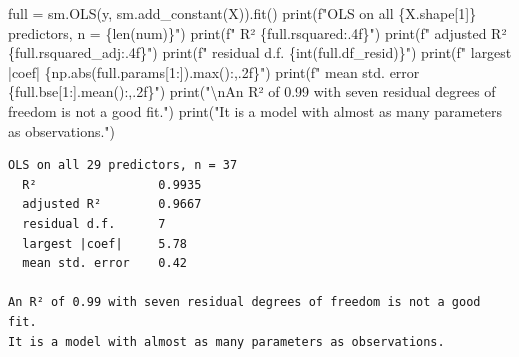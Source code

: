 \documentclass[
  letterpaper,
  10pt,
  twoside,
  openright,
  numbers=noenddot,
  chapterprefix=true]{scrbook}
\newenvironment{Shaded}{}{}
\newcommand{\BuiltInTok}[1]{\textcolor[rgb]{0.84,0.23,0.29}{#1}}
\newcommand{\CharTok}[1]{\textcolor[rgb]{0.01,0.18,0.38}{#1}}
\newcommand{\DecValTok}[1]{\textcolor[rgb]{0.00,0.36,0.77}{#1}}
\newcommand{\NormalTok}[1]{\textcolor[rgb]{0.14,0.16,0.18}{#1}}
\newcommand{\OperatorTok}[1]{\textcolor[rgb]{0.14,0.16,0.18}{#1}}
\newcommand{\SpecialCharTok}[1]{\textcolor[rgb]{0.00,0.36,0.77}{#1}}
\newcommand{\SpecialStringTok}[1]{\textcolor[rgb]{0.01,0.18,0.38}{#1}}
\newcommand{\StringTok}[1]{\textcolor[rgb]{0.01,0.18,0.38}{#1}}
\begin{document}
\label{check-variance}
\begin{Shaded}
\begin{Highlighting}[]
\NormalTok{full }\OperatorTok{=}\NormalTok{ sm.OLS(y, sm.add\_constant(X)).fit()}
\BuiltInTok{print}\NormalTok{(}\SpecialStringTok{f"OLS on all }\SpecialCharTok{\{}\NormalTok{X}\SpecialCharTok{.}\NormalTok{shape[}\DecValTok{1}\NormalTok{]}\SpecialCharTok{\}}\SpecialStringTok{ predictors, n = }\SpecialCharTok{\{}\BuiltInTok{len}\NormalTok{(num)}\SpecialCharTok{\}}\SpecialStringTok{"}\NormalTok{)}
\BuiltInTok{print}\NormalTok{(}\SpecialStringTok{f"  R²                 }\SpecialCharTok{\{}\NormalTok{full}\SpecialCharTok{.}\NormalTok{rsquared}\SpecialCharTok{:.4f\}}\SpecialStringTok{"}\NormalTok{)}
\BuiltInTok{print}\NormalTok{(}\SpecialStringTok{f"  adjusted R²        }\SpecialCharTok{\{}\NormalTok{full}\SpecialCharTok{.}\NormalTok{rsquared\_adj}\SpecialCharTok{:.4f\}}\SpecialStringTok{"}\NormalTok{)}
\BuiltInTok{print}\NormalTok{(}\SpecialStringTok{f"  residual d.f.      }\SpecialCharTok{\{}\BuiltInTok{int}\NormalTok{(full.df\_resid)}\SpecialCharTok{\}}\SpecialStringTok{"}\NormalTok{)}
\BuiltInTok{print}\NormalTok{(}\SpecialStringTok{f"  largest |coef|     }\SpecialCharTok{\{}\NormalTok{np}\SpecialCharTok{.}\BuiltInTok{abs}\NormalTok{(full.params[}\DecValTok{1}\NormalTok{:])}\SpecialCharTok{.}\BuiltInTok{max}\NormalTok{()}\SpecialCharTok{:,.2f\}}\SpecialStringTok{"}\NormalTok{)}
\BuiltInTok{print}\NormalTok{(}\SpecialStringTok{f"  mean std. error    }\SpecialCharTok{\{}\NormalTok{full}\SpecialCharTok{.}\NormalTok{bse[}\DecValTok{1}\NormalTok{:]}\SpecialCharTok{.}\NormalTok{mean()}\SpecialCharTok{:,.2f\}}\SpecialStringTok{"}\NormalTok{)}
\BuiltInTok{print}\NormalTok{(}\StringTok{"}\CharTok{\textbackslash{}n}\StringTok{An R² of 0.99 with seven residual degrees of freedom is not a good fit."}\NormalTok{)}
\BuiltInTok{print}\NormalTok{(}\StringTok{"It is a model with almost as many parameters as observations."}\NormalTok{)}
\end{Highlighting}
\end{Shaded}

\begin{verbatim}
OLS on all 29 predictors, n = 37
  R²                 0.9935
  adjusted R²        0.9667
  residual d.f.      7
  largest |coef|     5.78
  mean std. error    0.42

An R² of 0.99 with seven residual degrees of freedom is not a good fit.
It is a model with almost as many parameters as observations.
\end{verbatim}
\end{document}
